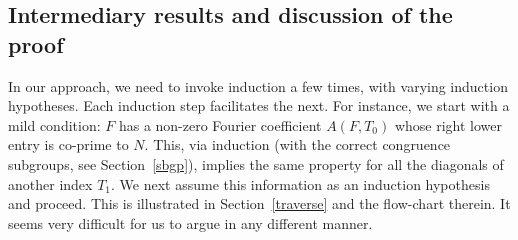\documentclass[11pt]{amsart}
\numberwithin{equation}{section}
\renewcommand*{\mod}{\operatorname{mod}}
\newcommand{\z}{\mathbb{Z}}
\begin{document}





\subsection{Intermediary results and discussion of the proof}
\label{preps}


In our approach, we need to invoke induction a few times, with varying induction hypotheses. Each induction step facilitates the next. For instance, we start with a mild condition: $F$ has a non-zero Fourier coefficient $A(F,T_0)$ whose right lower entry is co-prime to $N$. This, via induction (with the correct congruence subgroups, see Section~\ref{sbgp}), implies the same property for all the diagonals of another index $T_1$. We next assume this information as an induction hypothesis and proceed. This is illustrated in Section~\ref{traverse} and the flow-chart therein. It seems very difficult for us to argue in any different manner.


\end{document}
